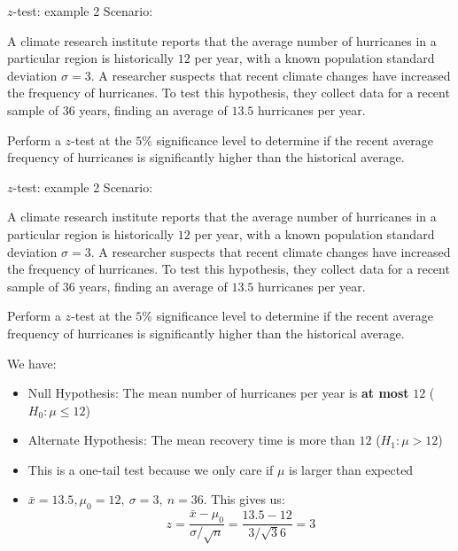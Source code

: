 \documentclass[t,8pt]{beamer}%
\begin{document}
\begin{frame}{$z$-test: example 2}
Scenario: \par
A climate research institute reports that the average number of hurricanes in a particular region is historically $12$ per year, with a known population standard deviation $\sigma=3$. A researcher suspects that recent climate changes have increased the frequency of hurricanes. To test this hypothesis, they collect data for a recent sample of $36$ years, finding an average of $13.5$ hurricanes per year. \par
Perform a $z$-test at the $5\%$ significance level to determine if the recent average frequency of hurricanes is significantly higher than the historical average.
\end{frame}

\begin{frame}{$z$-test: example 2}
Scenario: \par
A climate research institute reports that the average number of hurricanes in a particular region is historically $12$ per year, with a known population standard deviation $\sigma=3$. A researcher suspects that recent climate changes have increased the frequency of hurricanes. To test this hypothesis, they collect data for a recent sample of $36$ years, finding an average of $13.5$ hurricanes per year. \par
Perform a $z$-test at the $5\%$ significance level to determine if the recent average frequency of hurricanes is significantly higher than the historical average. \par
We have:
    \begin{itemize}
        \item Null Hypothesis: The mean number of hurricanes per year is {\bf at most} $12$ ($H_0:\mu\leq 12$)
        \item Alternate Hypothesis: The mean recovery time is more than $12$ ($H_1:\mu>12$)
        \item This is a one-tail test because we only care if $\mu$ is larger than expected
        \item $\bar x=13.5, \mu_0=12,\ \sigma=3,\ n=36$. This gives us:
        $$z=\frac{\bar x-\mu_0}{\sigma/\sqrt n}=\frac{13.5-12}{3/\sqrt 36}=3$$
    \end{itemize}
\end{frame}
\end{document}
